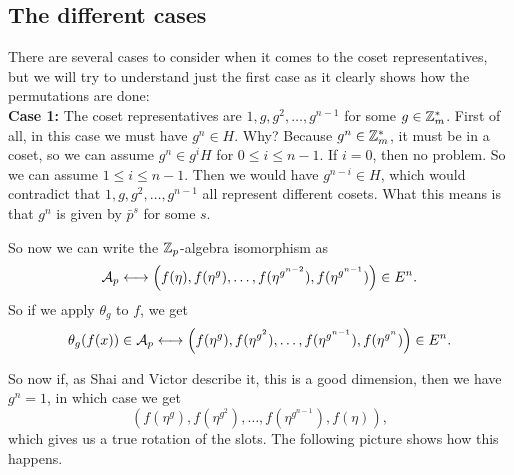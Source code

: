 \documentclass[12pt]{article}
\theoremstyle{plain}
\theoremstyle{definition}
\theoremstyle{remark}
\begin{document}
\subsection{The different cases}
There are several cases to consider when it comes to the coset representatives, but we will try to understand just the first case as it clearly shows how the permutations are done:
\\
{\bf Case 1:} The coset representatives are $1, g, g^2, \dots, g^{n-1}$ for some $g \in \mathbb{Z}_m^*$. First of all, in this case we must have $g^n\in H$. Why? Because $g^n\in \mathbb{Z}_m^*$, it must be in a coset, so we can assume $g^n\in g^iH$ for $0\leq i\leq n-1$. If $i=0$, then no problem. So we can assume $1\leq i\leq n-1$. Then we would have $g^{n-i} \in H$, which would contradict that $1, g, g^2, \dots, g^{n-1}$ all represent different cosets. What this means is that $g^n$ is given by $\bar{p}^s$ for some $s$.

So now we can write the $\mathbb{Z}_p$-algebra isomorphism as
$$\mathcal{A}_p \longleftrightarrow \left (f(\eta), f(\eta^g), \dots, f(\eta^{g^{n-2}}), f(\eta^{g^{n-1}})\right ) \in E^n.$$
So if we apply $\theta_g$ to $f$, we get
$$\theta_g(f(x))\in \mathcal{A}_p \longleftrightarrow \left (f(\eta^g), f(\eta^{g^2}), \dots, f(\eta^{g^{n-1}}), f(\eta^{g^{n}})\right ) \in E^n. $$

So now if, as Shai and Victor describe it, this is a good dimension, then we have $g^n=1$, in which case we get $$ \left (f(\eta^g), f(\eta^{g^2}), \dots, f(\eta^{g^{n-1}}), f(\eta)\right ),$$
which gives us a true rotation of the slots.
The following picture shows how this happens.

\bigskip
\end{document}
